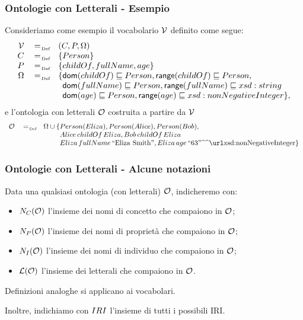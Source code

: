 \documentclass[8pt]{beamer}
\begin{document}
\begin{frame}
\frametitle{Ontologie con Letterali - Esempio}
Consideriamo come esempio il vocabolario $\mathcal{V}$ definito come segue:
\[
 \begin{array}{rcl}
  \Vocab & \defAs & (C, P, \Omega) \\
  C & \defAs & \{Person\}\\
  P & \defAs & \{childOf, fullName, age\}\\
  \Omega & \defAs & \{\dom(childOf) \Issub Person, \range(childOf) \Issub Person, \\
  &&\phantom{\{} \dom(fullName) \Issub Person, \range(fullName) \Issub xsd:string \\
  &&\phantom{\{} \dom(age) \Issub Person, \range(age) \Issub xsd:nonNegativeInteger \} ,
 \end{array}
\]
e l'ontologia con letterali $\mathcal{O}$ costruita a partire da $\mathcal{V}$
\[
 \begin{array}{rcl}
  \Ont & \defAs & \Omega \cup \{ Person(Eliza), Person(Alice), Person(Bob),\\
  &&\phantom{\Omega \cup \{}Alice\,childOf\,Eliza, Bob\,childOf\,Eliza\\
  &&\phantom{\Omega \cup \{}Eliza\,fullName\, \stringLiteral{Eliza Smith}, Eliza\,age\,\literal{63}{xsd:nonNegativeInteger} \}\\
 \end{array}
\]

\end{frame}

\begin{frame}
\frametitle{Ontologie con Letterali - Alcune notazioni}
Data una qualsiasi ontologia (con letterali) $\mathcal{O}$, indicheremo con:
\begin{itemize}
 \item $N_C(\mathcal{O})$ l'insieme dei nomi di concetto che compaiono in $\mathcal{O}$;
 \item $N_P(\mathcal{O})$ l'insieme dei nomi di propriet\`a che compaiono in $\mathcal{O}$;
 \item $N_I(\mathcal{O})$ l'insieme dei nomi di individuo che compaiono in $\mathcal{O}$;
 \item $\mathcal{L}(\mathcal{O})$ l'insieme dei letterali che compaiono in $\mathcal{O}$.
\end{itemize}
\vspace{\baselineskip}

Definizioni analoghe si applicano ai vocabolari.
\vspace{\baselineskip}

Inoltre, indichiamo con $IRI$ l'insieme di tutti i possibili IRI.
\end{frame}
\end{document}
